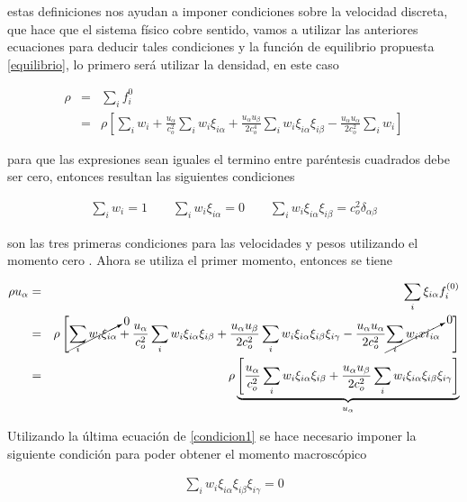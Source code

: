 \noindent estas definiciones nos ayudan a imponer condiciones sobre la velocidad discreta, que hace que el sistema físico cobre sentido, vamos a utilizar las anteriores ecuaciones para deducir tales condiciones y la función de equilibrio propuesta \eqref{equilibrio}, lo primero será utilizar la densidad, en este caso 

\begin{eqnarray}
\rho &=& \sum_{i}f_{i}^{0}\nonumber\\
&=&\rho\left[\sum_{i}w_{i}+\frac{u_{\alpha}}{c_{o}^{2}}\sum_{i}w_{i}\xi_{i\alpha}+\frac{u_{\alpha}u_{\beta}}{2c_{o}^{4}}\sum_{i}w_{i}\xi_{i\alpha}\xi_{i\beta}-\frac{u_{\alpha}u_{\alpha}}{2c_{o}^{2}}\sum_{i}w_{i}\right]
\end{eqnarray}


\noindent para que las expresiones sean iguales el termino entre paréntesis cuadrados debe ser cero, entonces resultan las siguientes condiciones 

\begin{eqnarray}
\label{condicion1}
\sum_{i}w_{i}=1\qquad \sum_{i}w_{i}\xi_{i\alpha} = 0 \qquad \sum_{i}w_{i}\xi_{i\alpha}\xi_{i\beta}=c_{o}^{2}\delta_{\alpha\beta}
\end{eqnarray}

\noindent son las tres primeras condiciones para las velocidades y pesos utilizando el momento cero . Ahora se utiliza el primer momento, entonces se tiene

\begin{eqnarray}
\rho u_{\alpha} &=& \sum_{i}\xi_{i\alpha}f_{i}^{(0)}\nonumber\\
&=&\rho\left[\cancelto{0}{\sum_{i}w_{i}\xi_{i\alpha}}+\frac{u_{\alpha}}{c_{o}^{2}}\sum_{i}w_{i}\xi_{i\alpha}\xi_{i\beta}+\frac{u_{\alpha}u_{\beta}}{2c_{o}^{2}}\sum_{i}w_{i}\xi_{i\alpha}\xi_{i\beta}\xi_{i\gamma}-\frac{u_{\alpha}u_{\alpha}}{2c_{o}^{2}}\cancelto{0}{\sum_{i}w_{i}xi_{i\alpha}}\quad\right]\nonumber\\
&=&\rho\underbrace{\left[\frac{u_{\alpha}}{c_{o}^{2}}\sum_{i}w_{i}\xi_{i\alpha}\xi_{i\beta}+\frac{u_{\alpha}u_{\beta}}{2c_{o}^{2}}\sum_{i}w_{i}\xi_{i\alpha}\xi_{i\beta}\xi_{i\gamma}\right]}_{u_{\alpha}}
\end{eqnarray}

Utilizando la última ecuación de \eqref{condicion1} se hace necesario imponer la siguiente condición para poder obtener el momento macroscópico

\begin{eqnarray}
\label{condicion2}
\sum_{i}w_{i}\xi_{i\alpha}\xi_{i\beta}\xi_{i\gamma} = 0 
\end{eqnarray}

